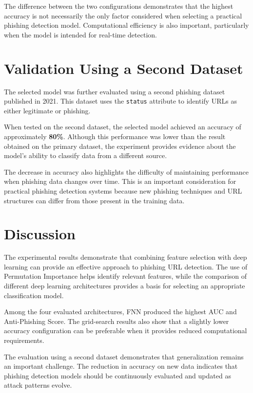 \documentclass[12pt,a4paper]{report}
\begin{document}
The difference between the two configurations demonstrates that the highest accuracy is not necessarily the only factor considered when selecting a practical phishing detection model. Computational efficiency is also important, particularly when the model is intended for real-time detection.

\section{Validation Using a Second Dataset}

The selected model was further evaluated using a second phishing dataset published in 2021. This dataset uses the \texttt{status} attribute to identify URLs as either legitimate or phishing.

When tested on the second dataset, the selected model achieved an accuracy of approximately \textbf{80\%}. Although this performance was lower than the result obtained on the primary dataset, the experiment provides evidence about the model's ability to classify data from a different source.

The decrease in accuracy also highlights the difficulty of maintaining performance when phishing data changes over time. This is an important consideration for practical phishing detection systems because new phishing techniques and URL structures can differ from those present in the training data.

\section{Discussion}

The experimental results demonstrate that combining feature selection with deep learning can provide an effective approach to phishing URL detection. The use of Permutation Importance helps identify relevant features, while the comparison of different deep learning architectures provides a basis for selecting an appropriate classification model.

Among the four evaluated architectures, FNN produced the highest AUC and Anti-Phishing Score. The grid-search results also show that a slightly lower accuracy configuration can be preferable when it provides reduced computational requirements.

The evaluation using a second dataset demonstrates that generalization remains an important challenge. The reduction in accuracy on new data indicates that phishing detection models should be continuously evaluated and updated as attack patterns evolve.
\end{document}
